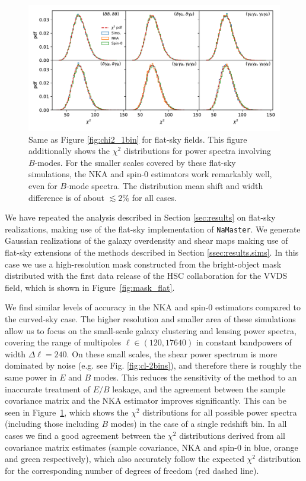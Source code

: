 \documentclass[a4paper,11pt]{article}
\begin{document}
    \begin{figure}
      \centering
      \includegraphics[width=\textwidth]{./figures/run_chi2_TT_TE_EE_TB_EB_BB.pdf}
      \caption{Same as Figure \ref{fig:chi2_1bin} for flat-sky fields. This figure additionally shows the $\chi^2$ distributions for power spectra involving $B$-modes. For the smaller scales covered by these flat-sky simulations, the NKA and spin-0 estimators work remarkably well, even for $B$-mode spectra. The distribution mean shift and width difference is of about $\lesssim 2\%$ for all cases.}
      \label{fig:chi2_1bin_flat}
    \end{figure}
    We have repeated the analysis described in Section \ref{sec:results} on flat-sky realizations, making use of the flat-sky implementation of {\tt NaMaster}. We generate Gaussian realizations of the galaxy overdensity and shear maps making use of flat-sky extensions of the methods described in Section \ref{ssec:results.sims}. In this case we use a high-resolution mask constructed from the bright-object mask distributed with the first data release of the HSC collaboration \cite{2018PASJ...70S...4A} for the VVDS field, which is shown in Figure~\ref{fig:mask_flat}. 
    
    We find similar levels of accuracy in the NKA and spin-0 estimators compared to the curved-sky case. The higher resolution and smaller area of these simulations allow us to focus on the small-scale galaxy clustering and lensing power spectra, covering the range of multipoles $\ell\in(120,17640)$ in constant bandpowers of width $\Delta \ell=240$. On these small scales, the shear power spectrum is more dominated by noise (e.g. see Fig. \ref{fig:cl-2bins}), and therefore there is roughly the same power in $E$ and $B$ modes. This reduces the sensitivity of the method to an inaccurate treatment of $E/B$ leakage, and the agreement between the sample covariance matrix and the NKA estimator improves significantly. This can be seen in Figure~\ref{fig:chi2_1bin_flat}, which shows the $\chi^2$ distributions for all possible power spectra (including those including $B$ modes) in the case of a single redshift bin. In all cases we find a good agreement between the $\chi^2$ distributions derived from all covariance matrix estimates (sample covariance, NKA and spin-0 in blue, orange and green respectively), which also accurately follow the expected $\chi^2$ distribution for the corresponding number of degrees of freedom (red dashed line).
    
\end{document}
